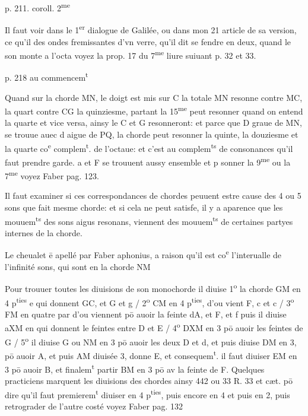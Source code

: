 \documentclass[11pt,a4paper]{article}
\begin{document}
p. 211. coroll. 2\textsuperscript{me}

Il faut voir dans le 1\textsuperscript{er} dialogue de Galilée, ou dans mon 21 article de sa version, ce qu'il \ill{} des ondes fremissantes d'vn verre, qu'il dit se fendre en deux, quand le son monte a l'octa voyez la prop. 17 du 7\textsuperscript{me} liure suiuant p. 32 et 33.

p. 218 au commencem\textsuperscript{t}

Quand sur la chorde MN, le doigt est mis sur C la totale MN resonne contre MC, la quart\ill{} contre CG la quinziesme, partant la 15\textsuperscript{me} peut resonner quand on entend la quarte et vice versa, ainsy le C et G resonneront: et parce que D graue de MN, se trouue auec d aigue de PQ, la chorde peut resonner la quinte, la douziesme et la quarte co\textsuperscript{e} complem\textsuperscript{t}. de l'octaue: et c'est au\ill{} complem\textsuperscript{ts} de consonances qu'il faut prendre garde. a et F se trouuent aussy ensemble et p\ill{} sonner la 9\textsuperscript{me} ou la 7\textsuperscript{me} voyez Faber pag. 123.

Il faut examiner si ces correspondances de chordes peuuent estre cause des 4 ou 5 sons que fait \ill{} mesme chorde: et si cela ne peut satisfe, il y a aparence que les mouuem\textsuperscript{ts} des sons aigus resonans, viennent des mouuem\textsuperscript{ts} de certaines partyes internes de la chorde.

Le cheualet ē  apellé par Faber aphonius, a raison qu'il est co\textsuperscript{e} l'interualle de l'infinité \ill{} sons, qui sont en la chorde NM

Pour trouuer toutes les diuisions de son monochorde il diuise 1\textsuperscript{o} la chorde GM en 4 p\textsuperscript{ties} e\ill{} qui donnent GC, et G et g / 2\textsuperscript{o} CM en 4 p\textsuperscript{ties}, d'ou vient F, c et c / 3\textsuperscript{o} FM en quatre par\ill{} d'ou viennent pō auoir la feinte dA, et F, et f puis il diuise aXM en \ill{} qui donnent le feintes entre D et E / 4\textsuperscript{o} DXM en 3 pō auoir les feintes de G / 5\textsuperscript{o} il diuise G ou NM en 3 pō auoir les deux D et d, et puis diuise DM en 3, pō auoir A, et puis AM diuisée  3, donne E, et consequem\textsuperscript{t}. il faut diuiser EM en 3 pō auoir B, et finalem\textsuperscript{t} partir BM en 3 pō av la feinte de F. Quelques practiciens marquent les diuisions des chordes ainsy 442 \ill{} ou 33 R. 33 et cæt. pō dire qu'il faut premierem\textsuperscript{t} diuiser en 4 p\textsuperscript{ties}, puis encore en 4 et puis en 2, puis retrograder de l'autre costé voyez Faber pag. 132
\end{document}
